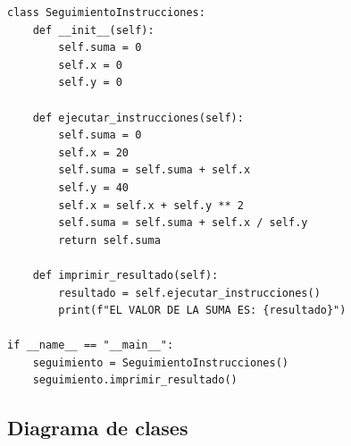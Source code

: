 \documentclass[12pt,a4paper]{article}
\begin{document}
\begin{lstlisting}[style=pythonstyle, caption={Seguimiento -- ejercicio\_resuelto5\_seguimiento.py}]
class SeguimientoInstrucciones:
    def __init__(self):
        self.suma = 0
        self.x = 0
        self.y = 0

    def ejecutar_instrucciones(self):
        self.suma = 0
        self.x = 20
        self.suma = self.suma + self.x
        self.y = 40
        self.x = self.x + self.y ** 2
        self.suma = self.suma + self.x / self.y
        return self.suma

    def imprimir_resultado(self):
        resultado = self.ejecutar_instrucciones()
        print(f"EL VALOR DE LA SUMA ES: {resultado}")

if __name__ == "__main__":
    seguimiento = SeguimientoInstrucciones()
    seguimiento.imprimir_resultado()
\end{lstlisting}

\subsection{Diagrama de clases}

\begin{figure}[H]
\centering
{}
\end{figure}

\newpage
\end{document}
